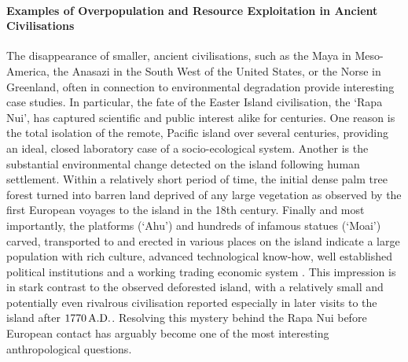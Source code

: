\paragraph{Examples of Overpopulation and Resource Exploitation in Ancient Civilisations}
The disappearance of smaller, ancient civilisations, such as the Maya in Meso-America, the Anasazi in the South West of the United States, or the Norse in Greenland, often in connection to environmental degradation provide interesting case studies.
In particular, the fate of the Easter Island civilisation, the `Rapa Nui', has captured scientific and public interest alike for centuries.
One reason is the total isolation of the remote, Pacific island over several centuries, providing an ideal, closed laboratory case of a socio-ecological system.
Another is the substantial environmental change detected on the island following human settlement.  
Within a relatively short period of time, the initial dense palm tree forest turned into barren land deprived of any large vegetation as observed by the first European voyages to the island in the 18th century.
Finally and most importantly, the platforms (`Ahu') and hundreds of infamous statues (`Moai') carved, transported to and erected in various places on the island indicate a large population with rich culture, advanced technological know-how, well established political institutions and a working trading economic system \citep{Cauwe2011}.
This impression is in stark contrast to the observed deforested island, with a relatively small and potentially even rivalrous civilisation reported especially in later visits to the island after $1770\, {\rm A.D.}$.
Resolving this mystery behind the Rapa Nui before European contact has arguably become one of the most interesting anthropological questions.

